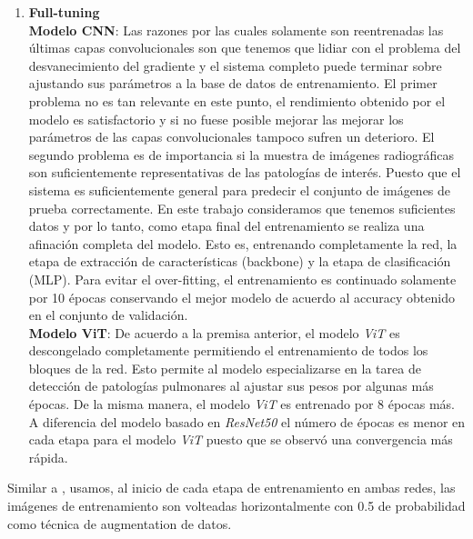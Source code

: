 {\begin{enumerate}
    \item \textbf{Full-tuning}\\
          \textbf{Modelo CNN}: Las razones por las cuales solamente son reentrenadas las últimas
          capas convolucionales son que tenemos que lidiar con el problema del desvanecimiento del
          gradiente y el sistema completo puede terminar sobre ajustando sus parámetros a la base de
          datos de entrenamiento. El primer problema no es tan relevante en este punto, el
          rendimiento obtenido por el modelo es satisfactorio y si no fuese posible mejorar las
          mejorar los parámetros de las capas convolucionales tampoco sufren un deterioro. El segundo
          problema es de importancia si la muestra de imágenes radiográficas son suficientemente
          representativas de las patologías de interés. Puesto que el sistema es suficientemente
          general para predecir el conjunto de imágenes de prueba correctamente. En este trabajo
          consideramos que tenemos suficientes datos y por lo tanto, como etapa final del entrenamiento
          se realiza una afinación completa del modelo. Esto es, entrenando completamente la red,
          la etapa de extracción de características (backbone) y la etapa de clasificación (MLP).
          Para evitar el over-fitting, el entrenamiento es continuado solamente por 10 épocas
          conservando el mejor modelo de acuerdo al accuracy obtenido en el conjunto de validación.\\
          \textbf{Modelo ViT}: De acuerdo a la premisa anterior, el modelo \textit{ViT} es descongelado completamente
          permitiendo el entrenamiento de todos los bloques de la red. Esto permite al modelo especializarse
          en la tarea de detección de patologías pulmonares al ajustar sus pesos por algunas más épocas.
          De la misma manera, el modelo \textit{ViT} es entrenado por 8 épocas más. A diferencia del
          modelo basado en \textit{ResNet50} el número de épocas es menor en cada etapa para el modelo
          \textit{ViT} puesto que se observó una convergencia más rápida.

\end{enumerate}

Similar a \citeauthor{rajpurkar2018deep}, usamos, al inicio de cada etapa de entrenamiento en ambas
redes, las imágenes de entrenamiento son volteadas horizontalmente con 0.5 de probabilidad como técnica de
augmentation de datos.

}

